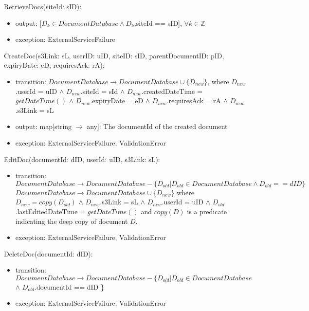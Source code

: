 \documentclass[12pt, titlepage]{article}
\begin{document}
  \noindent RetrieveDocs(siteId: sID):
  \begin{itemize}
    \item output: $[D_{k} \in DocumentDatabase \land D_{k}$.siteId ==
      sID], $\forall
      k \in \mathbb{Z}$
    \item exception: ExternalServiceFailure
  \end{itemize}

  \noindent CreateDoc(s3Link: sL, userID: uID, siteID: sID,
    parentDocumentID: pID,
  expiryDate: eD, requiresAck: rA):
  \begin{itemize}
    \item transition: $DocumentDatabase \rightarrow DocumentDatabase
      \cup \{D_{new}\}$, where $D_{new}$.userId = uID $\land$ $D_{new}$.siteId =
      sId $\land$ $D_{new}$.createdDateTime = $getDateTime()$ $\land$
      $D_{new}$.expiryDate = eD $\land$
      $D_{new}$.requiresAck = rA $\land$ $D_{new}$.s3Link = sL
    \item output: map[string $\rightarrow$ any]: The documentId of the created
      document
    \item exception: ExternalServiceFailure, ValidationError
  \end{itemize}

  \noindent EditDoc(documentId: dID, userId: uID, s3Link: sL):
  \begin{itemize}
    \item transition: $DocumentDatabase \rightarrow DocumentDatabase - \{D_{old}
      | D_{old} \in DocumentDatabase \land D_{old} == dID\}$\\
      $DocumentDatabase \rightarrow DocumentDatabase \cup
      \{D_{new}\}$ where $D_{new} = copy(D_{old})$ $\land$ $D_{new}$.s3Link = sL
      $\land$ $D_{new}$.userId = uID $\land$
      $D_{old}$.lastEditedDateTime = $getDateTime()$ and $copy(D)$ is
      a predicate indicating the
      deep copy of document $D$.
    \item exception: ExternalServiceFailure, ValidationError
  \end{itemize}

  \noindent DeleteDoc(documentId: dID):
  \begin{itemize}
    \item transition: $DocumentDatabase \rightarrow DocumentDatabase -
      \{D_{old} | D_{old} \in DocumentDatabase$ $\land$
      $D_{old}$.documentId == dID \}
    \item exception: ExternalServiceFailure, ValidationError
  \end{itemize}
\end{document}
